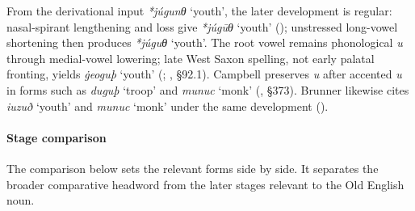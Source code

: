 \documentclass[
  british,
  a4paper,
]{article}
\providecommand{\Recon}[1]{\emph{*#1}}
\begin{document}
From the derivational input \Recon{júgunθ} `youth', the later
development is regular: nasal-spirant lengthening and loss give
\Recon{júgūθ} `youth' ();
unstressed long-vowel shortening then produces \Recon{júguθ} `youth'.
The root vowel remains phonological \emph{u} through medial-vowel
lowering; late West Saxon spelling, not early palatal fronting, yields
{\emph{ġeoguþ}} `youth' (; ,
§92.1). Campbell preserves \emph{u} after accented \emph{u} in forms
such as {\emph{duguþ}} `troop' and {\emph{munuc}} `monk'
(, §373). Brunner
likewise cites {\emph{iuzuð}} `youth' and {\emph{munuc}} `monk' under
the same development ().

\paragraph{Stage comparison}\label{stage-comparison-4}

The comparison below sets the relevant forms side by side. It separates
the broader comparative headword from the later stages relevant to the
Old English noun.
\end{document}
